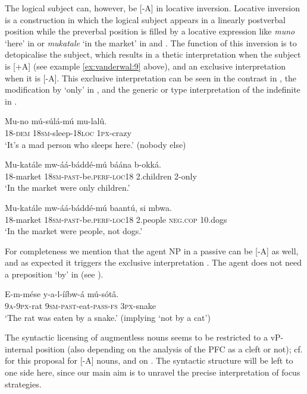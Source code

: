 \documentclass[output=paper]{langsci/langscibook}
\begin{document}
The logical subject can, however, be [-A] in locative inversion. Locative inversion is a construction in which the logical subject appears in a linearly postverbal position while the preverbal position is filled by a locative expression like \textit{muno} ‘here’ in  or \textit{mukatale} ‘in the market’ in  and . The function of this inversion is to detopicalise the subject, which results in a thetic interpretation when the subject is [+A] (see example \ref{ex:vanderwal:9} above), and an exclusive interpretation when it is [-A]. This exclusive interpretation can be seen in the contrast in , the modification by ‘only’ in , and the generic or type interpretation of the indefinite in .

\ea\label{ex:vanderwal:35}
\gll   Mu-no    mú-súlá-mú    mu-lalû.\\
       18-\textsc{dem}  \textsc{18sm}-sleep-\textsc{18loc}  \textsc{1px}-crazy\\
\glt   ‘It’s a mad person who sleeps here.’ (nobody else)
\z

\ea\label{ex:vanderwal:36}
\gll   Mu-katále  mw-áá-báddé-mú      báána    b-okká.\\
       18-market  \textsc{18sm}-\textsc{past}-be.\textsc{perf}-\textsc{loc18}  2.children  2-only\\
\glt   ‘In the market were only children.’
\z

\ea\label{ex:vanderwal:37}
\gll   Mu-katále  mw-áá-báddé-mú    baantú,    si    mbwa.\\
       18-market  \textsc{18sm}-\textsc{past}-be.\textsc{perf}-\textsc{loc18}  2.people  \textsc{neg}.\textsc{cop}  10.dogs\\
\glt   ‘In the market were people, not dogs.’
\z

For completeness we mention that the agent NP in a passive can be [-A] as well, and as expected it triggers the exclusive interpretation . The agent does not need a preposition ‘by’ in  (see \citealt{Pak2008}).

\ea\label{ex:vanderwal:38}
\gll   E-m-mése  y-a-l-ííbw-á      mú-sótâ.\\
       \textsc{9a}-\textsc{9px}-rat  \textsc{9sm}-\textsc{past}-eat-\textsc{pass}-\textsc{fs}  \textsc{3px}-snake\\
\glt   ‘The rat was eaten by a snake.’ (implying ‘not by a cat’)
\z

The syntactic licensing of augmentless nouns seems to be restricted to a vP-internal position (also depending on the analysis of the PFC as a cleft or not); cf. \citet{Halpert2012,Halpert2013} for this proposal for  [-A] nouns, and \citet{CarstensMletshe2015,CarstensMletshe2016} on . The syntactic structure will be left to one side here, since our main aim is to unravel the precise interpretation of focus strategies.
\end{document}
